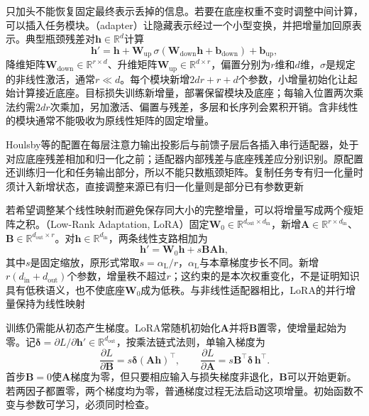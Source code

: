 只加头不能恢复固定最终表示丢掉的信息。若要在底座权重不变时调整中间计算，可以插入任务模块。（adapter）让隐藏表示经过一个小型变换，并把增量加回原表示。典型瓶颈残差对$\bm h\in\mathbb R^d$计算
\begin{equation}
  \bm h'=\bm h+
     \bm W_{\mathrm{up}}\,
       \sigma(\bm W_{\mathrm{down}}\bm h+\bm b_{\mathrm{down}})
       +\bm b_{\mathrm{up}},
  \label{eq:ket-transfer-adapter}
\end{equation}
降维矩阵$\bm W_{\mathrm{down}}\in\mathbb R^{r\times d}$、升维矩阵$\bm W_{\mathrm{up}}\in\mathbb R^{d\times r}$，偏置分别为$r$维和$d$维，$\sigma$是规定的非线性激活，通常$r\ll d$。每个模块新增$2dr+r+d$个参数，小增量初始化让起始计算接近底座。目标损失训练新增量，部署保留模块及底座；每输入位置两次乘法约需$2dr$次乘加，另加激活、偏置与残差，多层和长序列会累积开销。含非线性的模块通常不能吸收为原线性矩阵的固定增量。

Houlsby等的配置在每层注意力输出投影后与前馈子层后各插入串行适配器，处于对应底座残差相加和归一化之前；适配器内部残差与底座残差应分别识别。原配置还训练归一化和任务输出部分，所以不能只数瓶颈矩阵。复制任务专有归一化量时须计入新增状态，直接调整来源已有归一化量则是部分已有参数更新

若希望调整某个线性映射而避免保存同大小的完整增量，可以将增量写成两个瘦矩阵之积。（Low-Rank Adaptation, LoRA）固定$\bm W_0\in\mathbb R^{d_{\mathrm{out}}\times d_{\mathrm{in}}}$，新增$\bm A\in\mathbb R^{r\times d_{\mathrm{in}}}$、$\bm B\in\mathbb R^{d_{\mathrm{out}}\times r}$。对$\bm h\in\mathbb R^{d_{\mathrm{in}}}$，两条线性支路相加为
\begin{equation}
  \bm h'=\bm W_0\bm h+s\bm B\bm A\bm h,
  \label{eq:ket-transfer-lora}
\end{equation}
其中$s$是固定缩放，原形式常取$s=\alpha_{\mathrm L}/r$，$\alpha_{\mathrm L}$与本章梯度步长不同。新增$r(d_{\mathrm{in}}+d_{\mathrm{out}})$个参数，增量秩不超过$r$；这约束的是本次权重变化，不是证明知识具有低秩语义，也不使底座$\bm W_0$成为低秩。与非线性适配器相比，LoRA的并行增量保持为线性映射

训练仍需能从初态产生梯度。LoRA常随机初始化$\bm A$并将$\bm B$置零，使增量起始为零。记$\bm\delta=\partial L/\partial\bm h'\in\mathbb R^{d_{\mathrm{out}}}$，按乘法链式法则，单输入梯度为
\[
  \frac{\partial L}{\partial\bm B}
       =s\bm\delta(\bm A\bm h)^\top,\qquad
  \frac{\partial L}{\partial\bm A}
       =s\bm B^\top\bm\delta\,\bm h^\top.
\]
首步$\bm B=0$使$\bm A$梯度为零，但只要相应输入与损失梯度非退化，$\bm B$可以开始更新。若两因子都置零，两个梯度均为零，普通梯度过程无法启动这项增量。初始函数不变与参数可学习，必须同时检查。

